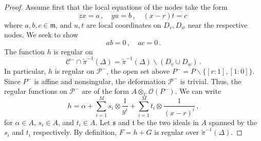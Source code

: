 \documentclass[11pt]{amsart}
\theoremstyle{definition}
\renewcommand{\tilde}{\widetilde}
\begin{document}
{\begin{proof}
Assume first that the local equations of the nodes take the form $$zx=a\, , \quad yu=b\, , \quad (x-r)t=c\,$$ where $a, b, c\in \mathfrak m$, and $u, t$ are local coordinates on $D_v,D_w$ near the respective nodes. We seek to show $$ab=0\, , \quad ac=0\,.$$ 
The function $h$ is regular on $${\mathcal C}^{-}\cap \tilde \pi^{-1}(\Delta)=\widetilde \pi^{-1}(\Delta) \smallsetminus (D_v\cup D_w)\, .$$
In particular, $h$ is regular on $\mathcal P^-$, the open set above $P^-=P\smallsetminus \{[r:1], [1:0]\}$. Since $P^-$ is affine and nonsingular, the deformation $\mathcal P^-$ is trivial. Thus, the regular functions on $\mathcal P^-$ are of the form $A\otimes_{\mathbb C} \mathcal O(P^-)$. %
We can write \begin{equation}\label{hh}h=\alpha+\sum_{i=1}^M s_i \otimes \frac{1}{y^i}+\sum_{i=1}^M  t_i\otimes \frac{1}{(x-r)^i}\,,\end{equation} for $\alpha\in A$, $s_i\in A$, and $t_i\in A$. Let $\mathfrak s$ and $\mathfrak t$ be the two ideals in $A$ spanned by the $s_i$ and $t_i$ respectively. By definition, $F=h+G$ is regular over $\widetilde \pi^{-1}(\Delta)$. 


\end{proof}}
\end{document}
